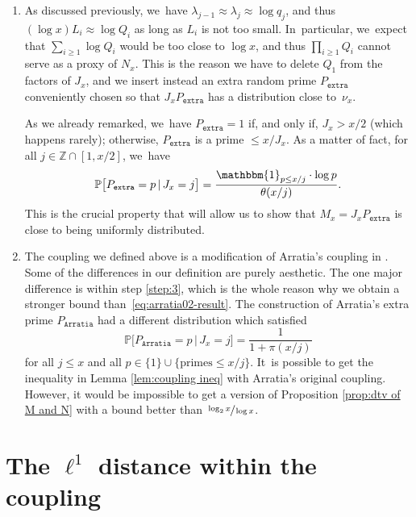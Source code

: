 \documentclass[10pt]{amsart}
\newenvironment{enumeratea}
{\bgroup\def\theenumi{\alph{enumi}}\begin{enumerate}}
{\end{enumerate}\egroup}
\newcommand{\ZZ}{\mathbb{Z}}
\newcommand{\PP}{\mathbb{P}}
\newcommand{\one}{\mathbbm{1}}
\newcommand{\pextra}{P_{\mathtt{extra}}}
\newcommand{\parratia}{P_{\mathtt{Arratia}}}
\newcommand{\bg}{\big}
\theoremstyle{plain}
\theoremstyle{definition}
\begin{document}
\begin{enumeratea}
\item\label{rem:couplinga}
As discussed previously, we~have $\lambda_{j-1}\approx \lambda_j\approx \log q_j$, and thus $(\log x)L_i \approx \log Q_i$ as long as $L_i$ is not too small. In~particular, we~expect that $\sum_{i \ge 1} \log Q_i$ would be too close to $\log x$, and thus $\prod_{i\ge1}Q_i$ cannot serve as a proxy of $N_x$. This is the reason we have to delete $Q_1$ from the factors of $J_x$, and we insert instead an extra random prime $\pextra$ conveniently chosen so that $J_x\pextra$ has a distribution close to~$\nu_x$.

As we already remarked, we~have $\pextra=1$ if, and only if, $J_x > x/2$ (which happens rarely); otherwise, $\pextra$ is a prime $\le x/J_x$. As a matter of fact, for all $j\in\ZZ\cap[1,x/2]$, we~have
\begin{equation}
\label{eq:distribution of Pextra}
\PP\bg[\pextra = p\,|\, J_x = j\bg] = \frac{\one_{p\le x/j}\cdot\log p}{\theta(x/j)}.
\end{equation}
This is the crucial property that will allow us to show that $M_x=J_x\pextra$ is close to being uniformly distributed.

\item\label{rem:couplingb}
The coupling we defined above is a modification of Arratia's coupling in \cite{Arratia02}. Some of the differences in our definition are purely aesthetic. The one major difference is within step \eqref{step:3}, which is the whole reason why we obtain a stronger bound than~\eqref{eq:arratia02-result}. The construction of Arratia's extra prime $\parratia$ had a different distribution which satisfied
\begin{equation}
\label{eq:extraprime-arratia}
\PP\bg[\parratia = p\,|\, J_x=j\bg] = \frac{1}{1+\pi(x/j)}
\end{equation}
for all $j\le x$ and all $p \in \{1\}\cup\{\text{primes}\le x/j\}$. It~is possible to get the inequality in Lemma \ref{lem:coupling ineq} with Arratia's original coupling. However, it would be impossible to get a version of Proposition \ref{prop:dtv of M and N} with a bound better than $\sfrac{\log_2x}{\log x}$.
\end{enumeratea}

\section{The \texorpdfstring{$\ell^1$}{l1} distance within the coupling}\label{sec:proof of Lemma coupling ineq}
\end{document}
